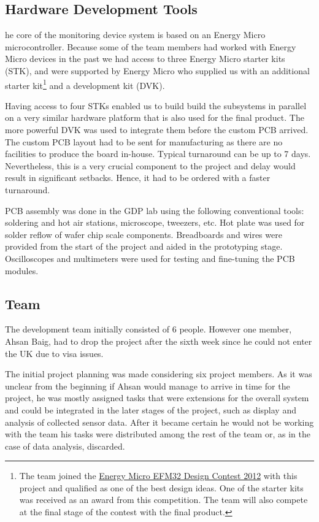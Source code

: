 \subsection{Hardware Development Tools}
he core of the monitoring device system is based on an Energy Micro microcontroller. Because some of the team members had worked with Energy Micro devices in the past we had access to three Energy Micro starter kits (STK), and were supported by Energy Micro who supplied us with an additional starter kit\footnote{The team joined the \href{ http://forum.energymicro.com/forum/49-efm32-design-contest-2012/}{Energy Micro EFM32 Design Contest 2012}  with this project and qualified as one of the best design ideas. One of the starter kits was received as an award from this competition. The team will also compete at the final stage of the contest with the final product.}
and a development kit (DVK). 

Having access to four STKs enabled us to build build the subsystems in parallel on a very similar hardware platform that is also used for the final product. The more powerful DVK was used to integrate them before the custom PCB arrived. The custom PCB layout had to be sent for manufacturing as there are no facilities to produce the board in-house. Typical turnaround can be up to 7 days. Nevertheless, this is a very crucial component to the project and delay would result in significant setbacks. Hence, it had to be ordered with a faster turnaround.

PCB assembly was done in the GDP lab using the following conventional tools: soldering and hot air stations, microscope, tweezers, etc. Hot plate was used for solder reflow of wafer chip scale components. Breadboards and wires were provided from the start of the project and aided in the prototyping stage. Oscilloscopes and multimeters were used for testing and fine-tuning the PCB modules.


\subsection{Team}
The development team initially consisted of 6 people. However one member, Ahsan Baig, had to drop the project after the sixth week since he could not enter the UK due to visa issues.

The initial project planning was made considering six project members. As it was unclear from the beginning if Ahsan would manage to arrive in time for the project, he was mostly assigned tasks that were extensions for the overall system and could be integrated in the later stages of the project, such as display and analysis of collected sensor data. After it became certain he would not be working with the team his tasks were distributed among the rest of the team or, as in the case of data analysis, discarded. 


